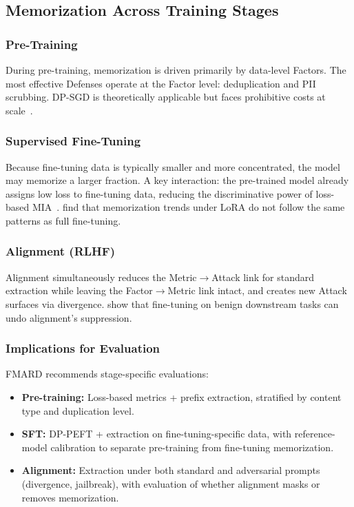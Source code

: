 \documentclass[11pt]{article}
\begin{document}
\subsection{Memorization Across Training Stages}

\subsubsection{Pre-Training}
During pre-training, memorization is driven primarily by data-level Factors.
The most effective Defenses operate at the Factor level: deduplication and PII
scrubbing.
DP-SGD is theoretically applicable but faces prohibitive costs at
scale~\citep{li2021large}.

\subsubsection{Supervised Fine-Tuning}
Because fine-tuning data is typically smaller and more concentrated, the model
may memorize a larger fraction.
A key interaction: the pre-trained model already assigns low loss to
fine-tuning data, reducing the discriminative power of loss-based
MIA~\citep{duan2024membership}.
\citet{wang2025leanertraininglowerleakage} find that memorization trends under
LoRA do not follow the same patterns as full fine-tuning.

\subsubsection{Alignment (RLHF)}
Alignment simultaneously reduces the Metric$\to$Attack link for standard
extraction while leaving the Factor$\to$Metric link intact, and creates new
Attack surfaces via divergence.
\citet{liu2026alignmentwhackamolefinetuning} show that fine-tuning on benign
downstream tasks can undo alignment's suppression.

\subsubsection{Implications for Evaluation}
FMARD recommends stage-specific evaluations:
\begin{itemize}[nosep]
  \item \textbf{Pre-training:} Loss-based metrics + prefix extraction,
    stratified by content type and duplication level.
  \item \textbf{SFT:} DP-PEFT + extraction on fine-tuning-specific data, with
    reference-model calibration to separate pre-training from fine-tuning
    memorization.
  \item \textbf{Alignment:} Extraction under both standard and adversarial
    prompts (divergence, jailbreak), with evaluation of whether alignment
    masks or removes memorization.
\end{itemize}
\end{document}
